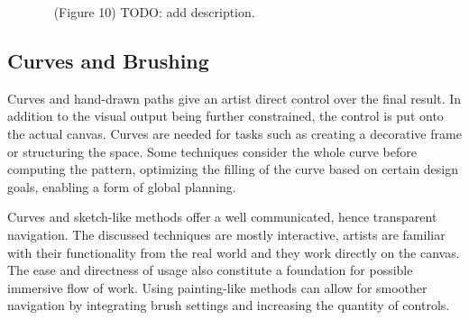 \begin{figure}[H]
    \centering
    \label{fig:hsu_2020_aef}
    \caption{\citeauthor*{hsu_2020_aef}~\cite{hsu_2020_aef} (Figure 10) TODO: add description. \color{orange}{Status rights: ACM requested}}
\end{figure}


\subsection{Curves and Brushing}
\label{subsubsec:analysis_creative_means_curves}

Curves and hand-drawn paths give an artist direct control over the final result. In addition to the visual output being further constrained, the control is put onto the actual canvas. Curves are needed for tasks such as creating a decorative frame or structuring the space. Some techniques consider the whole curve before computing the pattern, optimizing the filling of the curve based on certain design goals, enabling a form of global planning.

Curves and sketch-like methods offer a well communicated, hence transparent navigation. The discussed techniques are mostly interactive, artists are familiar with their functionality from the real world and they work directly on the canvas. The ease and directness of usage also constitute a foundation for possible immersive flow of work. Using painting-like methods can allow for smoother navigation by integrating brush settings and increasing the quantity of controls.

